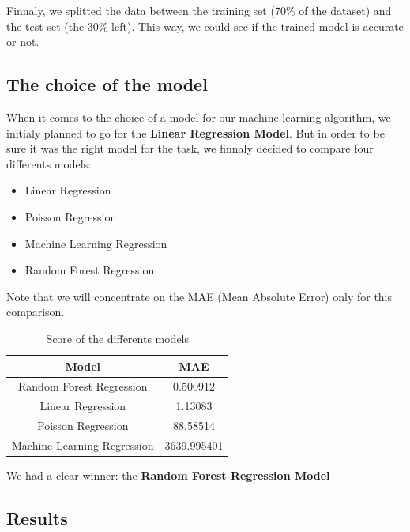 \documentclass[conference]{IEEEtran}
\begin{document}
Finnaly, we splitted the data between the training set (70\% of the dataset) and the test set (the 30\% left). This way, we could see if the trained model is accurate or not.

\subsection{The choice of the model}

When it comes to the choice of a model for our machine learning algorithm, we initialy planned to go for the \textbf{Linear Regression Model}. But in order to be sure it was the right model for the task, we finnaly decided to compare four differents models:
\begin{itemize}
\item Linear Regression
\item Poisson Regression
\item Machine Learning Regression
\item Random Forest Regression
\end{itemize}

Note that we will concentrate on the MAE (Mean Absolute Error) only for this comparison.\\
\begin{table}[!h]
\begin{center}
\begin{tabular}{|c|c|}
\hline
\textbf{Model} & \textbf{MAE}\\
\hline
Random Forest Regression & 0.500912 \\
Linear Regression & 1.13083 \\
Poisson Regression & 88.58514\\
Machine Learning Regression  & 3639.995401 \\
\hline
\end{tabular}
\end{center}
\caption{Score of the differents models}
\end{table}

We had a clear winner: the \textbf{Random Forest Regression Model} 

\subsection{Results}
\end{document}
